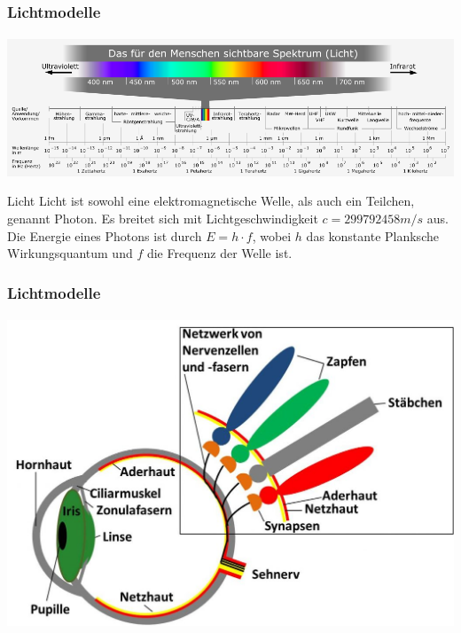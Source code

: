 \documentclass{beamer}
\begin{document}
\begin{frame}
    \frametitle{Lichtmodelle}
\framesubtitle{}
\begin{center}
    \includegraphics[width=1.0\textwidth]{images/Electromagnetic_spectrum_c.png}
\end{center}
\begin{block}{Licht}
Licht ist sowohl eine elektromagnetische Welle, als auch ein Teilchen, genannt Photon. Es breitet sich mit Lichtgeschwindigkeit $c=299 792 458 m/s$ aus. 
Die Energie eines Photons ist 
durch $E=h \cdot f$, wobei  $h$ das konstante Planksche Wirkungsquantum und $f$ die Frequenz der Welle ist.
\end{block}
\end{frame}

\begin{frame}
    \frametitle{Lichtmodelle}
\framesubtitle{}
\begin{center}
\includegraphics[scale=0.35]{images/Auge}
\end{center}

\end{frame}
\end{document}
